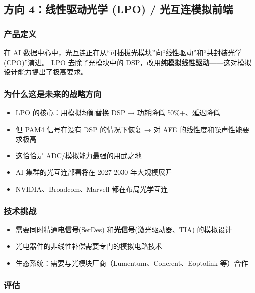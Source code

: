\documentclass[11pt,a4paper]{ctexart}
\begin{document}
\subsection{方向 4：线性驱动光学 (LPO) / 光互连模拟前端}

\subsubsection{产品定义}
在 AI 数据中心中，光互连正在从``可插拔光模块''向``线性驱动''和``共封装光学 (CPO)''演进。
LPO 去除了光模块中的 DSP，改用\textbf{纯模拟线性驱动}——这对模拟设计能力提出了极高要求。

\subsubsection{为什么这是未来的战略方向}

\begin{itemize}
    \item LPO 的核心：用模拟均衡替换 DSP → 功耗降低 50\%+、延迟降低
    \item 但 PAM4 信号在没有 DSP 的情况下恢复 → 对 AFE 的线性度和噪声性能要求极高
    \item 这恰恰是 ADC/模拟能力最强的用武之地
    \item AI 集群的光互连部署将在 2027-2030 年大规模展开
    \item NVIDIA、Broadcom、Marvell 都在布局光学互连
\end{itemize}

\subsubsection{技术挑战}

\begin{itemize}
    \item 需要同时精通\textbf{电信号}(SerDes) 和\textbf{光信号}(激光驱动器、TIA) 的模拟设计
    \item 光电器件的非线性补偿需要专门的模拟电路技术
    \item 生态系统：需要与光模块厂商（Lumentum、Coherent、Eoptolink 等）合作
\end{itemize}

\subsubsection{评估}
\end{document}
